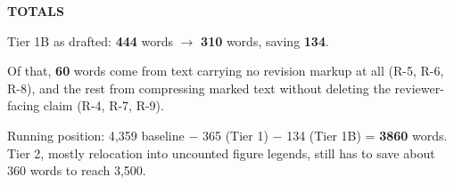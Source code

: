 \documentclass[11pt,a4paper]{article}
\begin{document}
\vspace{0.8em}
\begin{center}\textbf{TOTALS}\end{center}
\noindent Tier 1B as drafted: \textbf{444} words $\rightarrow$ \textbf{310} words, saving \textbf{134}.\par
\smallskip
\noindent Of that, \textbf{60} words come from text carrying no revision markup at all
(R-5, R-6, R-8), and the rest from compressing marked text without deleting the reviewer-facing claim
(R-4, R-7, R-9).\par
\smallskip
\noindent Running position: 4{,}359 baseline $-$ 365 (Tier 1) $-$ 134 (Tier 1B) = \textbf{3860} words.
Tier 2, mostly relocation into uncounted figure legends, still has to save about 360 words to reach 3{,}500.\par
\end{document}
